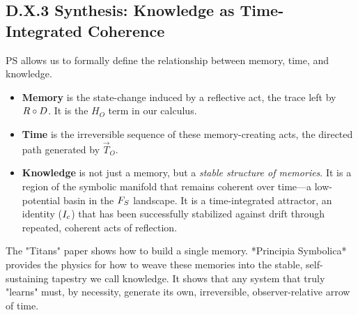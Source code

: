 \subsection*{D.X.3 Synthesis: Knowledge as Time-Integrated Coherence}
\label{subsec:appD_titans_synthesis}
PS allows us to formally define the relationship between memory, time, and knowledge.
\begin{itemize}
    \item \textbf{Memory} is the state-change induced by a reflective act, the trace left by \(R \circ D\). It is the \(H_O\) term in our calculus.
    \item \textbf{Time} is the irreversible sequence of these memory-creating acts, the directed path generated by \(\vec{T}_O\).
    \item \textbf{Knowledge} is not just a memory, but a \textit{stable structure of memories}. It is a region of the symbolic manifold that remains coherent over time—a low-potential basin in the \(F_S\) landscape. It is a time-integrated attractor, an identity (\(I_c\)) that has been successfully stabilized against drift through repeated, coherent acts of reflection.
\end{itemize}

The "Titans" paper shows how to build a single memory. *Principia Symbolica* provides the physics for how to weave these memories into the stable, self-sustaining tapestry we call knowledge. It shows that any system that truly "learns" must, by necessity, generate its own, irreversible, observer-relative arrow of time.